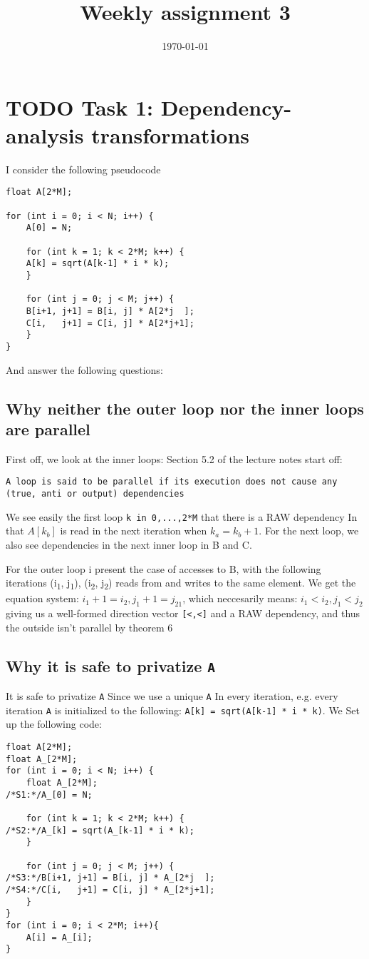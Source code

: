 \documentclass[11pt]{article}
\date{\today}
\title{Weekly assignment 3}
\begin{document}
\maketitle
\tableofcontents

\section{{\bfseries\sffamily TODO} Task 1: Dependency-analysis transformations}
\label{sec:org64498d4}
I consider the following pseudocode
\begin{verbatim}
float A[2*M];

for (int i = 0; i < N; i++) {
    A[0] = N;

    for (int k = 1; k < 2*M; k++) {
	A[k] = sqrt(A[k-1] * i * k);
    }

    for (int j = 0; j < M; j++) {
	B[i+1, j+1] = B[i, j] * A[2*j  ];
	C[i,   j+1] = C[i, j] * A[2*j+1];
    }
}
\end{verbatim}
And answer the following questions:
\subsection{Why neither the outer loop nor the inner loops are parallel}
\label{sec:org88463c3}
First off, we look at the inner loops:  
Section 5.2 of the lecture notes start off:
\begin{verbatim}
A loop is said to be parallel if its execution does not cause any (true, anti or output) dependencies
\end{verbatim}
We see easily the first loop \texttt{k in 0,...,2*M} that there is a RAW dependency
In that \(A[k_b]\) is read in the next iteration when \(k_a = k_b + 1\).
For the next loop, we also see dependencies in the next inner loop in B and C.

For the outer loop i present the case of accesses to B, with the
following iterations (i\textsubscript{1}, j\textsubscript{1}), (i\textsubscript{2}, j\textsubscript{2}) reads from and writes to the same element.
We get the equation system: \(i_1 + 1 = i_2, j_1 + 1 = j_21\), which neccesarily means:
\(i_1 < i_2, j_1 < j_2\) giving us a well-formed direction vector \texttt{[<,<]} and a RAW 
dependency, and thus the outside isn't parallel by theorem 6

\subsection{Why it is safe to privatize \texttt{A}}
\label{sec:org0a39c80}
It is safe to privatize \texttt{A} Since we use a unique \texttt{A} In every iteration, e.g. every iteration
\texttt{A} is initialized to the following: \texttt{A[k] = sqrt(A[k-1] * i * k)}. We Set up the following
code:
\begin{verbatim}
float A[2*M];
float A_[2*M];
for (int i = 0; i < N; i++) {
    float A_[2*M];
/*S1:*/A_[0] = N;

    for (int k = 1; k < 2*M; k++) {
/*S2:*/A_[k] = sqrt(A_[k-1] * i * k);
    }

    for (int j = 0; j < M; j++) {
/*S3:*/B[i+1, j+1] = B[i, j] * A_[2*j  ];
/*S4:*/C[i,   j+1] = C[i, j] * A_[2*j+1];
    }
}
for (int i = 0; i < 2*M; i++){
    A[i] = A_[i];
}
\end{verbatim}
\end{document}
